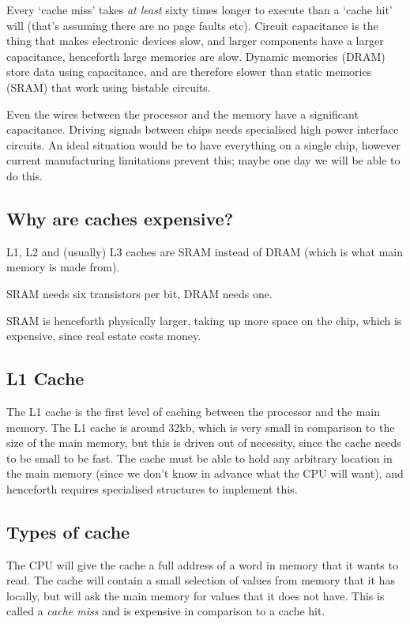Every `cache miss' takes \textit{at least} sixty times longer to execute than a
`cache hit' will (that's assuming there are no page faults etc). Circuit
capacitance is the thing that makes electronic devices slow, and larger
components have a larger capacitance, henceforth large memories are slow.
Dynamic memories (DRAM) store data using capacitance, and are therefore slower
than static memories (SRAM) that work using bistable circuits.

Even the wires between the processor and the memory have a significant
capacitance. Driving signals between chips needs specialised high power
interface circuits. An ideal situation would be to have everything on a single
chip, however current manufacturing limitations prevent this; maybe one day we
will be able to do this.


\subsection{Why are caches expensive?}

L1, L2 and (usually) L3 caches are SRAM instead of DRAM (which is what main
memory is made from).

SRAM needs six transistors per bit, DRAM needs one.

SRAM is henceforth physically larger, taking up more space on the chip, which is
expensive, since real estate costs money.


\subsection{L1 Cache}

The L1 cache is the first level of caching between the processor and the main
memory. The L1 cache is around 32kb, which is very small in comparison to the
size of the main memory, but this is driven out of necessity, since the cache
needs to be small to be fast. The cache must be able to hold any arbitrary
location in the main memory (since we don't know in advance what the CPU will
want), and henceforth requires specialised structures to implement this.


\subsection{Types of cache}

The CPU will give the cache a full address of a word in memory that it wants to
read. The cache will contain a small selection of values from memory that it has
locally, but will ask the main memory for values that it does not have. This is
called a \textit{cache miss} and is expensive in comparison to a cache hit.

